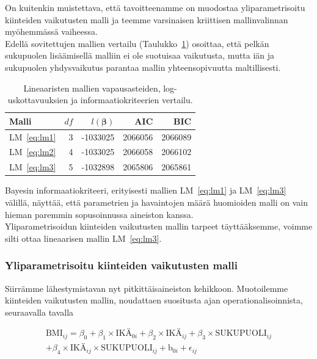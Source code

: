 \documentclass[finnish]{docopts}
\begin{document}
On kuitenkin muistettava, että tavoitteenamme on muodostaa yliparametrisoitu kiinteiden vaikutusten malli ja teemme varsinaisen kriittisen mallinvalinnan myöhemmässä vaiheessa.\\

Edellä sovitettujen mallien vertailu (Taulukko~\ref{table:lm_summary}) osoittaa, että pelkän sukupuolen lisäämisellä malliin ei ole suotuisaa vaikutusta, mutta iän ja sukupuolen yhdysvaikutus parantaa mallin yhteensopivuutta maltillisesti. 

\begin{table}[H]
\centering
\begin{tabular}{lrrrr}
\toprule
Malli & $df$ & $l(\bm{\beta})$ & AIC & BIC\\
\midrule
LM~\ref{eq:lm1} & 3 & -1033025 & 2066056 & 2066089\\
LM~\ref{eq:lm2} & 4 & -1033025 & 2066058 & 2066102\\
LM~\ref{eq:lm3} & 5 & -1032898 & 2065806 & 2065861\\
\bottomrule
\end{tabular}
\caption{Lineaaristen mallien vapausasteiden, log-uskottavuuksien ja informaatiokriteerien vertailu.}
\label{table:lm_summary}
\end{table}

Bayesin informaatiokriteeri, erityisesti mallien LM~\ref{eq:lm1} ja LM~\ref{eq:lm3} välillä, näyttää, että parametrien ja havaintojen määrä huomioiden malli on vain hieman paremmin sopusoinnussa aineiston kanssa.\\

Yliparametrisoidun kiinteiden vaikutusten mallin tarpeet täyttääksemme, voimme silti ottaa lineaarisen mallin LM~\ref{eq:lm3}.\\

\subsubsection{Yliparametrisoitu kiinteiden vaikutusten malli}
\label{ssb:yliparammalli}

Siirrämme lähestymistavan nyt pitkittäisaineiston kehikkoon. Muotoilemme kiinteiden vaikutusten mallin, noudattaen \cite{fitzmaurice11} suositusta ajan operationalisoinnista, seuraavalla tavalla

\begin{equation}
\begin{split}
 \text{BMI}_{ij} = \beta_0 + \beta_1 \times \text{IKÄ}_{0i} + \beta_2 \times \text{IKÄ}_{ij} + \beta_3 \times \text{SUKUPUOLI}_{ij}  \\
 + \beta_4 \times \text{IKÄ}_{ij} \times \text{SUKUPUOLI}_{ij} + \text{b}_{0i} + \epsilon_{ij}
\label{eq:lme1}
\end{split}
\end{equation}
\end{document}
